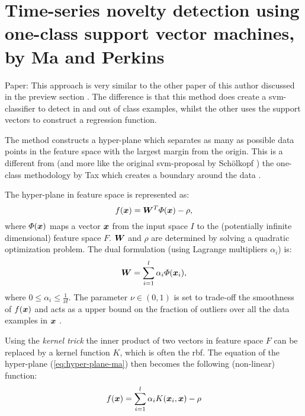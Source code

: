 \section{Time-series novelty detection using one-class support vector machines, by Ma and Perkins}
Paper: \cite{ma2003time}
This approach is very similar to the other paper of this author discussed in the preview section \cite{ma2003online}.
The difference is that this method does create a \gls{svm}-classifier to detect in and out of class examples, whilst the other uses the support vectors to construct a regression function.

The method constructs a hyper-plane which separates as many as possible data points in the feature space with the largest margin from the origin.
This is a different from (and more like the original \gls{svm}-proposal by Sch\"olkopf \cite{scholkopf1999support}) the one-class methodology by Tax which creates a boundary around the data \cite{tax2004support}.

The hyper-plane in feature space is represented as:
%
\begin{equation}\label{eq:hyper-plane-ma}
  f(\vectorsym{x}) = \matrixsym{W}^\transpose \Phi(\vectorsym{x}) - \rho,
\end{equation}
%
where $\Phi(\vectorsym{x})$ maps a vector $\vectorsym{x}$ from the input space $I$ to the (potentially infinite dimensional) feature space $F$.
$\matrixsym{W}$ and $\rho$ are determined by solving a quadratic optimization problem.
The dual formulation (using Lagrange multipliers $\alpha_i$) is:
%
\begin{equation}
  \matrixsym{W} = \sum_{i=1}^l \alpha_i \Phi(\vectorsym{x}_i),
\end{equation}
%
where $0 \leq \alpha_i \leq \frac{1}{\nu l}$.
The parameter $\nu \in (0,1)$ is set to trade-off the smoothness of $f(\vectorsym{x})$ and acts as a upper bound on the fraction of outliers over all the data examples in $\vectorsym{x}$ \cite{scholkopf1999support}.

Using the \emph{kernel trick} the inner product of two vectors in feature space $F$ can be replaced by a kernel function $K$, which is often the \gls{rbf}.
The equation of the hyper-plane (\ref{eq:hyper-plane-ma}) then becomes the following (non-linear) function:
%
\begin{equation}
  f(\vectorsym{x}) = \sum_{i=1}^l \alpha_i K(\vectorsym{x}_i, \vectorsym{x}) - \rho
\end{equation}
%

